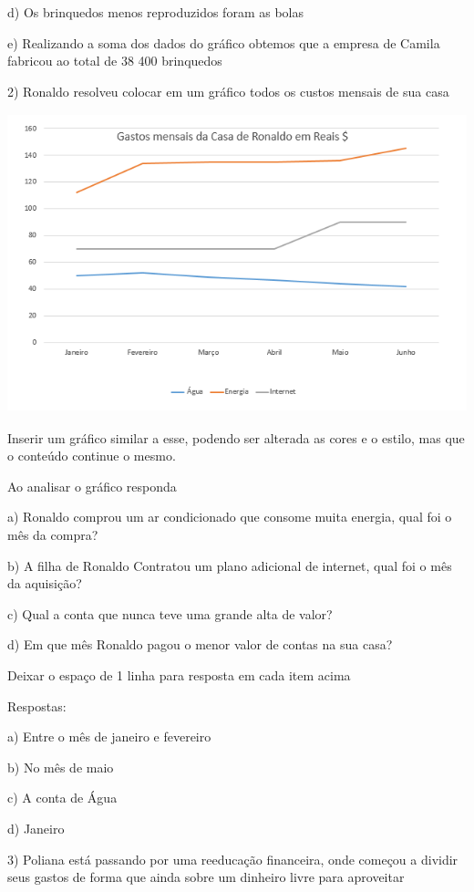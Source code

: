 {d) Os brinquedos menos reproduzidos foram as bolas

e) Realizando a soma dos dados do gráfico obtemos que a empresa de
Camila fabricou ao total de 38 400 brinquedos

2) Ronaldo resolveu colocar em um gráfico todos os custos mensais de sua
casa

\includegraphics[width=5.30833in,height=3.41384in]{./imgSAEB_8_MAT/media/image40.png}

Inserir um gráfico similar a esse, podendo ser alterada as cores e o
estilo, mas que o conteúdo continue o mesmo.

Ao analisar o gráfico responda

a) Ronaldo comprou um ar condicionado que consome muita energia, qual
foi o mês da compra?

b) A filha de Ronaldo Contratou um plano adicional de internet, qual foi
o mês da aquisição?

c) Qual a conta que nunca teve uma grande alta de valor?

d) Em que mês Ronaldo pagou o menor valor de contas na sua casa?

Deixar o espaço de 1 linha para resposta em cada item acima

Respostas:

a) Entre o mês de janeiro e fevereiro

b) No mês de maio

c) A conta de Água

d) Janeiro

3) Poliana está passando por uma reeducação financeira, onde começou a
dividir seus gastos de forma que ainda sobre um dinheiro livre para
aproveitar

}
